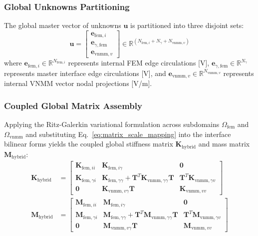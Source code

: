 \documentclass[preprint,12pt]{elsarticle}
\begin{document}
\subsubsection{Global Unknowns Partitioning}
The global master vector of unknowns $\mathbf{u}$ is partitioned into three disjoint sets:
\begin{equation}
\mathbf{u} = \begin{bmatrix} \mathbf{e}_{\mathrm{fem}, i} \\[4pt] \mathbf{e}_{\gamma, \mathrm{fem}} \\[4pt] \mathbf{e}_{\mathrm{vnmm}, v} \end{bmatrix} \in \mathbb{R}^{(N_{\mathrm{fem}, i} + N_\gamma + N_{\mathrm{vnmm}, v})}
\label{eq:master_unknowns_vector}
\end{equation}
where $\mathbf{e}_{\mathrm{fem}, i} \in \mathbb{R}^{N_{\mathrm{fem}, i}}$ represents internal FEM edge circulations [V], $\mathbf{e}_{\gamma, \mathrm{fem}} \in \mathbb{R}^{N_\gamma}$ represents master interface edge circulations [V], and $\mathbf{e}_{\mathrm{vnmm}, v} \in \mathbb{R}^{N_{\mathrm{vnmm}, v}}$ represents internal VNMM vector nodal projections [V/m].

\subsubsection{Coupled Global Matrix Assembly}
Applying the Ritz-Galerkin variational formulation across subdomains $\Omega_{\mathrm{fem}}$ and $\Omega_{\mathrm{vnmm}}$ and substituting Eq.~\eqref{eq:matrix_scale_mapping} into the interface bilinear forms yields the coupled global stiffness matrix $\mathbf{K}_{\mathrm{hybrid}}$ and mass matrix $\mathbf{M}_{\mathrm{hybrid}}$:
\begin{align}
\mathbf{K}_{\mathrm{hybrid}} &= \begin{bmatrix} 
\mathbf{K}_{\mathrm{fem}, ii} & \mathbf{K}_{\mathrm{fem}, i\gamma} & \mathbf{0} \\[4pt]
\mathbf{K}_{\mathrm{fem}, \gamma i} & \mathbf{K}_{\mathrm{fem}, \gamma\gamma} + \mathbf{T}^T \mathbf{K}_{\mathrm{vnmm}, \gamma\gamma} \mathbf{T} & \mathbf{T}^T \mathbf{K}_{\mathrm{vnmm}, \gamma v} \\[4pt]
\mathbf{0} & \mathbf{K}_{\mathrm{vnmm}, v\gamma} \mathbf{T} & \mathbf{K}_{\mathrm{vnmm}, vv}
\end{bmatrix} \label{eq:k_hybrid_matrix} \\[6pt]
\mathbf{M}_{\mathrm{hybrid}} &= \begin{bmatrix} 
\mathbf{M}_{\mathrm{fem}, ii} & \mathbf{M}_{\mathrm{fem}, i\gamma} & \mathbf{0} \\[4pt]
\mathbf{M}_{\mathrm{fem}, \gamma i} & \mathbf{M}_{\mathrm{fem}, \gamma\gamma} + \mathbf{T}^T \mathbf{M}_{\mathrm{vnmm}, \gamma\gamma} \mathbf{T} & \mathbf{T}^T \mathbf{M}_{\mathrm{vnmm}, \gamma v} \\[4pt]
\mathbf{0} & \mathbf{M}_{\mathrm{vnmm}, v\gamma} \mathbf{T} & \mathbf{M}_{\mathrm{vnmm}, vv}
\end{bmatrix} \label{eq:m_hybrid_matrix}
\end{align}
\end{document}
